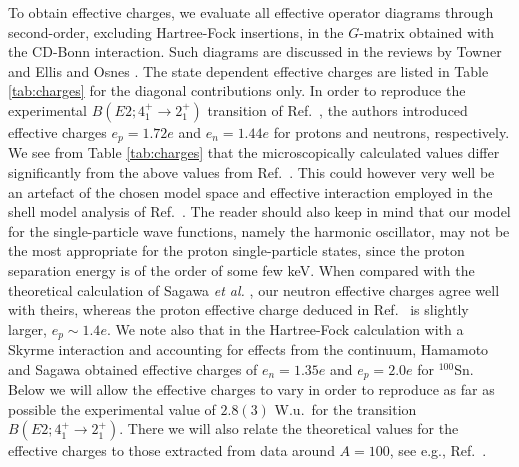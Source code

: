 To obtain effective charges, we 
evaluate all effective operator diagrams through second-order,
excluding Hartree-Fock insertions,  in the 
$G$-matrix obtained with  the CD-Bonn interaction. Such diagrams 
are discussed in the reviews by Towner \cite{towner87} 
and Ellis and Osnes \cite{eo77}.   
The state dependent effective charges are listed in Table
\ref{tab:charges} for the diagonal contributions only.
In order to reproduce the experimental $B(E2;4_1^+\rightarrow 2_1^+)$
transition of Ref.\ \cite{sb106}, the authors introduced 
effective charges $e_p=1.72e$ and
$e_n=1.44e$ for protons and neutrons, respectively.
We see from Table \ref{tab:charges} that the microscopically calculated
values differ significantly from the above values
from  Ref.\ \cite{sb106}. This
could however very well be an artefact of the chosen model space and 
effective interaction employed in the shell model analysis of
Ref.\ \cite{sb106}. The reader should also keep in mind that our
model for the single-particle wave functions, namely the 
harmonic oscillator, may not be the most appropriate for the proton
single-particle states, 
since the proton separation energy is of the order of some
few keV. 
When compared with the theoretical calculation of Sagawa {\em et al.} \cite{ssbw87},
our neutron effective charges agree well with theirs, whereas the proton effective charge
deduced in Ref.\ \cite{ssbw87} is slightly larger, $e_p\sim 1.4e$. We note also that in the 
Hartree-Fock calculation with a Skyrme interaction and 
accounting for effects from the continuum, 
Hamamoto and Sagawa \cite{hs97} obtained
effective charges of $e_n=1.35e$  and $e_p=2.0e$ for $^{100}$Sn. 
Below we will allow the effective charges
to vary in order to  reproduce as far as possible
the  experimental value of $2.8(3)$ W.u.\  for the transition 
$B(E2;4_1^+\rightarrow 2_1^+)$. There we will also relate the theoretical
values for the effective charges to those extracted from data
around $A=100$, see e.g., Ref.\ \cite{matej}.



